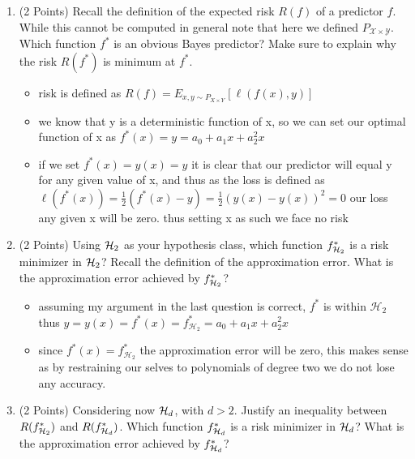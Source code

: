 \documentclass{article}
\begin{document}
\begin{enumerate}
    \item (2 Points) Recall the definition of the expected risk $R(f)$ of a predictor $f$. While this cannot be computed in general note that here we defined $P_{\mathcal{X} \times \mathcal{Y}}$. Which function $f^*$ is an obvious Bayes predictor? Make sure to explain why the risk $R(f^*)$ is minimum at $f^*$.
    \begin{itemize}
        \item risk is defined as $R(f)=E_{x,y\sim P_{X\times Y}}[\ell(f(x),y)]$
        \item we know that y is a deterministic function of x, so we can set our optimal function of x as $f^{*}(x)=y=a_0+a_1x+a_2^2x$
        \item if we set $f^{*}(x)=y(x)=y$ it is clear that our predictor will equal y for any given value of x, and thus as the loss is defined as $\ell(f^{*}(x))=\frac{1}{2}(f^{*}(x)-y)=\frac{1}{2}(y(x)-y(x))^2=0$ our loss any given x will be zero. thus setting x as such we face no risk
    \end{itemize}

    
    \item (2 Points) Using ${\mathcal{H}}_2$ as your hypothesis class, which function $f^*_{{\mathcal{H}}_2}$ is a risk minimizer in ${\mathcal{H}}_2$? Recall the definition of the approximation error. What is the approximation error achieved by $f^*_{{\mathcal{H}}_2}$?

\begin{itemize}
    \item assuming my argument in the last question is correct, $f^{*}$ is within $\mathcal{H}_{2}$ thus $y=y(x)=f^{*}(x)=f^{*}_{\mathcal{H}_2}=a_0+a_1x+a_2^2x$
    \item since $f^{*}(x)=f^{*}_{\mathcal{H}_2}$ the approximation error will be zero, this makes sense as by restraining our selves to polynomials of degree two we do not lose any accuracy.
\end{itemize}

    
    \item (2 Points) Considering now ${\mathcal{H}}_d$, with $d>2$. Justify an inequality between $R(f^*_{{\mathcal{H}}_2})$ and $R(f^*_{{\mathcal{H}}_d})$. Which function $f^*_{{\mathcal{H}}_d}$ is a risk minimizer in ${\mathcal{H}}_d$? What is the approximation error achieved by $f^*_{{\mathcal{H}}_d}$?


\end{enumerate}
\end{document}

